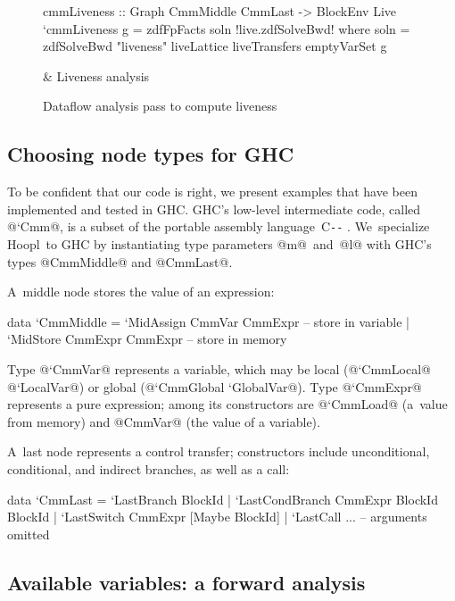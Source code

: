 \documentclass[blockstyle,preprint,natbib,nocopyrightspace]{sigplanconf}
\newcommand\ourlib{Hoopl}  %
\let\cite\citep
\newcommand\PAL{\mbox{C{\texttt{-{}-}}}}
\newcommand\figlabel[1]{\label{fig:#1}}
\begin{document}
\begin{figure*}
\begin{codetable}
\T
\begin{code}
cmmLiveness :: Graph CmmMiddle CmmLast -> BlockEnv Live
`cmmLiveness g = zdfFpFacts soln
!live.zdfSolveBwd!   where soln = zdfSolveBwd "liveness" liveLattice liveTransfers emptyVarSet g
\end{code}
\B
& Liveness \mbox{analysis}\\
\end{codetable}
\caption{Dataflow analysis pass to compute liveness}
\figlabel{liveness-all}
\figlabel{liveness}
\figlabel{live-lattice}
\figlabel{live-transfers}
\figlabel{live-running}
\end{figure*}
%
%


\subsection{Choosing node types for GHC}

To be confident that our code is right,
we present examples that
have been implemented and tested in GHC.  
GHC's low-level intermediate code, called @`Cmm@, is a 
 subset of 
the portable assembly language~{\PAL}
\cite{peyton-jones-ramsey:exceptions}.
We~specialize \ourlib\ to GHC by instantiating type parameters
@m@~and~@l@ with GHC's types @CmmMiddle@ and @CmmLast@.

A~middle node stores the value of an expression:
\begin{code}
data `CmmMiddle 
  = `MidAssign CmmVar  CmmExpr -- store in variable
  | `MidStore  CmmExpr CmmExpr -- store in memory
\end{code}
Type @`CmmVar@ represents a variable, which may be local (@`CmmLocal@
@`LocalVar@) or global 
(@`CmmGlobal `GlobalVar@). %
Type @`CmmExpr@ represents a pure expression; 
among its constructors are @`CmmLoad@ (a~value from memory)
and @CmmVar@ (the value of a variable).

A~last node represents a control transfer; constructors include
unconditional, conditional, and indirect branches, as well as a call:
\begin{code}
data `CmmLast
  = `LastBranch     BlockId
  | `LastCondBranch CmmExpr BlockId BlockId
  | `LastSwitch     CmmExpr [Maybe BlockId]
  | `LastCall ...     -- arguments omitted
\end{code}






\subsection{Available variables: a forward analysis} 
\end{document}
